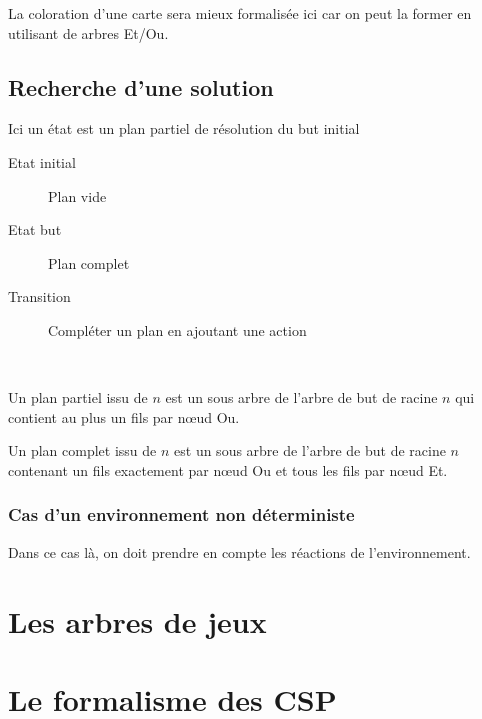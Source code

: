 \documentclass[12pt,a4paper,openany]{book}
\begin{document}
	\begin{remarque}
	La coloration d'une carte sera mieux formalisée ici car on peut la former en utilisant de arbres Et/Ou.
		\end{remarque}

	\section{Recherche d'une solution}
	Ici un état est un plan partiel de résolution du but initial
	\begin{description}
		\item[Etat initial]Plan vide
		\item[Etat but] Plan complet
		\item[Transition] Compléter un plan en ajoutant une action 
	\end{description}
	
~
	\begin{definition}
		Un plan partiel issu de $n$ est un sous arbre de l'arbre de but de racine $n$ qui contient au plus un fils par nœud Ou.
	\end{definition}

	\begin{definition}
		Un plan complet issu de $n$ est un sous arbre de l'arbre de but de racine $n$ contenant un fils exactement par nœud Ou et tous les fils par
		nœud Et.
	\end{definition}

	\subsection{Cas d'un environnement non déterministe}
	Dans ce cas là, on doit prendre en compte les réactions de l'environnement.
	\chapter{Les arbres de jeux}
	\chapter{Le formalisme des CSP}
\end{document}
